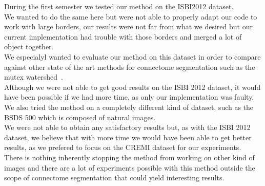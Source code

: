 During the first semester we tested our method on the ISBI2012 dataset.\\
We wanted to do the same here but were not able to properly adapt our code to
work with large borders, our results were not far from what we desired but our
current implementation had trouble with those borders and merged a lot of
object together.\\

We especialyl wanted to evaluate our method on this dataset in order to compare
against other state of the art methods for connectome segmentation such
as the mutex watershed~\cite{wolf_mutex_2019}.\\

Although we were not able to get good results on the ISBI 2012 dataset, it
would have been possible if we had more time, as only our implementation was
faulty.\\

We also tried the method on a completely different kind of dataset, such as the
BSDS 500 which is composed of natural images.\\
We were not able to obtain any satisfactory results but, as with the ISBI 2012
dataset, we believe that with more time we would have been able to get better
results, as we prefered to focus on the CREMI dataset for our experiments.\\

There is nothing inherently stopping the method from working on other kind of
images and there are a lot of experiments possible with this method outside the
scope of connectome segmentation that could yield interesting results.


